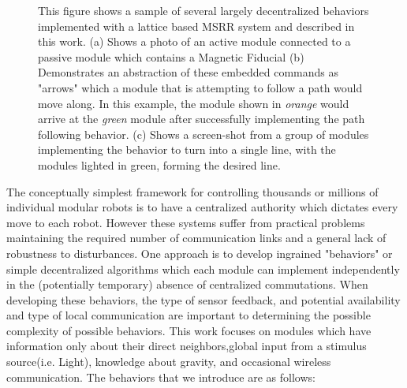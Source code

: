 \begin{figure}[t]
\begin{subfigure}[b]{\linewidth}
	\end{subfigure}
	
	
	\caption{This figure shows a sample of several largely decentralized behaviors implemented with a lattice based MSRR system and described in this work. (a) Shows a photo of an active module connected to a passive module which contains a Magnetic Fiducial  (b) Demonstrates an abstraction of these embedded commands as "arrows" which a module that is attempting to follow a path would move along. In this example, the module shown in \emph{orange} would arrive at the \emph{green} module after successfully implementing the path following behavior. (c) Shows a screen-shot from a group of modules implementing the behavior to turn into a single line, with the modules lighted in green, forming the desired line.}
	
	\label{fig:intro}
\end{figure}

The conceptually simplest framework for controlling thousands or millions of individual modular robots is to have a centralized authority which dictates every move to each robot. However these systems suffer from practical problems maintaining the required number of communication links and a general lack of robustness to disturbances. One approach is to develop ingrained "behaviors" or simple decentralized algorithms which each module can implement independently in the (potentially temporary) absence of centralized commutations. When developing these behaviors, the type of sensor feedback, and potential availability and type of local communication are important to determining the possible complexity of possible behaviors. This work focuses on modules which have information only about their direct neighbors,global input from a stimulus source(i.e. Light), knowledge about gravity, and occasional wireless communication. The behaviors that we introduce are as follows:

